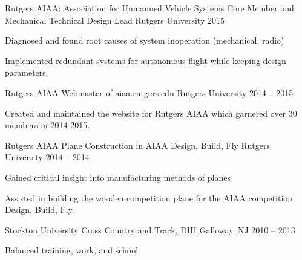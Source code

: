 

\begin{cventries}

  \cventry
    {Rutgers AIAA: Association for Unmanned Vehicle Systems} %
    {Core Member and Mechanical Technical Design Lead} %
    {Rutgers University} %
    {2015} %
    {
      \begin{cvitems} %
        \item {Diagnosed and found root causes of system inoperation (mechanical, radio)}
        \item {Implemented redundant systems for autonomous flight while keeping design parameters.}
      \end{cvitems}
    }
  \cventry
    {Rutgers AIAA} %
    {Webmaster of \href{http://www.aiaa.rutgers.edu}{aiaa.rutgers.edu}} %
    {Rutgers University} %
    {2014 -- 2015} %
    {
      \begin{cvitems} %
        \item {Created and maintained the website for Rutgers AIAA which garnered over 30 members in 2014-2015.}
      \end{cvitems}
    }
  \cventry
    {Rutgers AIAA} %
    {Plane Construction in AIAA Design, Build, Fly} %
    {Rutgers University} %
    {2014 -- 2014} %
    {
      \begin{cvitems} %
        \item {Gained critical insight into manufacturing methods of planes}
        \item {Assisted in building the wooden competition plane for the AIAA competition Design, Build, Fly.}
      \end{cvitems}
    }

 \cventry
  {Stockton University}
  {Cross Country and Track, DIII}
  {Galloway, NJ}
  {2010 -- 2013}
  {
   \begin{cvitems}
    \item {Balanced training, work, and school}
   \end{cvitems}
  }
  
\end{cventries}
  

